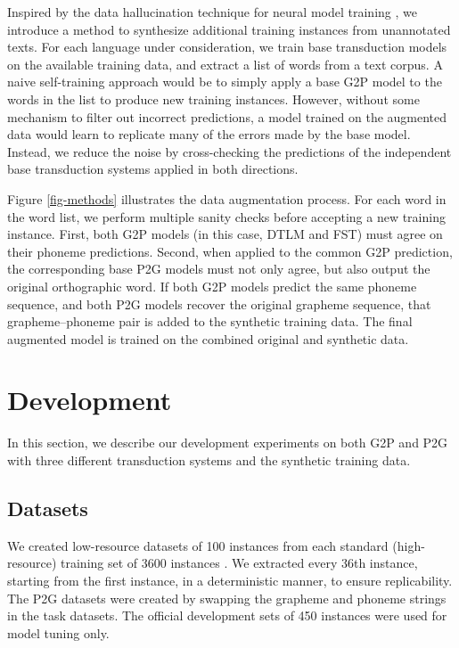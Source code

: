 \documentclass[11pt,a4paper]{article}
\begin{document}
Inspired by the data hallucination technique for neural model training 
\cite{silfverberg2017, anastasopoulos2019},
we introduce a method to 
synthesize additional training instances from unannotated texts.
For each language under consideration,
we train base transduction models on the available training data,
and extract a list of words from a text corpus.
A naive self-training approach would be
to simply apply a base G2P model to the words in the list
to produce new training instances.
However, 
without some mechanism to filter out incorrect predictions,
a model trained on the augmented data
would learn to replicate many of the errors made by the base model.
Instead, we reduce the noise
by cross-checking the predictions of 
the independent base transduction systems
applied in both %
directions.


Figure \ref{fig-methods} illustrates the data augmentation process.
For each word in the word list,
we perform multiple sanity checks 
before accepting a new training instance.
First, both G2P models
(in this case, DTLM and FST)
must agree on their phoneme predictions.
Second, 
when applied to the common G2P prediction,
the corresponding base P2G models must not only agree,
but also output the original orthographic word.
If both G2P models predict the same phoneme sequence,
and both P2G models recover the original grapheme sequence,
that grapheme--phoneme pair is added to the synthetic training data.
The final augmented model is trained
on the combined original and synthetic data.






\section{Development}
\label{development}

In this section, 
we describe our development experiments on both G2P and P2G
with three different transduction systems %
and the synthetic training data.

\subsection{Datasets}

We created low-resource datasets of 100 instances
from each standard (high-resource) 
training set of 3600 instances \cite{WikiPron}.
We extracted every 36th instance,
starting from the first instance,
in a deterministic manner, to ensure replicability.
The P2G datasets were created by swapping the grapheme
and phoneme strings in the task datasets.
The official development sets of 450 instances
were used for model tuning only.
\end{document}
